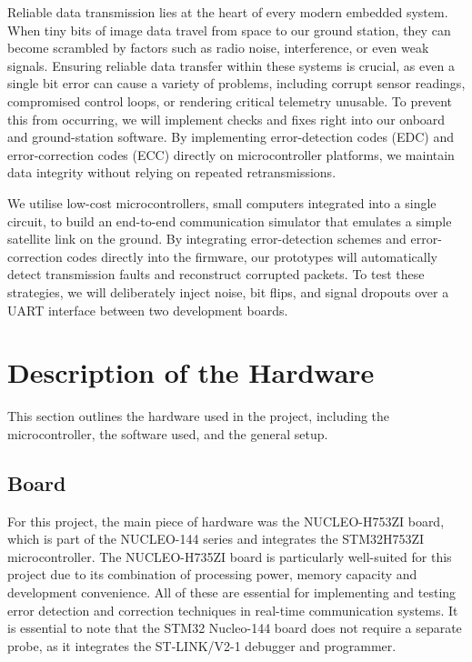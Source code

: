 \documentclass{scrartcl}
\begin{document}
Reliable data transmission lies at the heart of every modern embedded system. When tiny bits of image data travel from space to our ground station, they can become scrambled by factors such as radio noise, interference, or even weak signals. Ensuring reliable data transfer within these systems is crucial, as even a single bit error can cause a variety of problems, including corrupt sensor readings, compromised control loops, or rendering critical telemetry unusable. To prevent this from occurring, we will implement checks and fixes right into our onboard and ground-station software. By implementing error-detection codes (EDC) and error-correction codes (ECC) directly on microcontroller platforms, we maintain data integrity without relying on repeated retransmissions.

We utilise low-cost microcontrollers, small computers integrated into a single circuit, to build an end-to-end communication simulator that emulates a simple satellite link on the ground. By integrating error-detection schemes and error-correction codes directly into the firmware, our prototypes will automatically detect transmission faults and reconstruct corrupted packets. To test these strategies, we will deliberately inject noise, bit flips, and signal dropouts over a \gls{UART} interface between two development boards. 

\newpage

\section{Description of the Hardware}

This section outlines the hardware used in the project, including the microcontroller, the software used, and the general setup.

\subsection{Board}

For this project, the main piece of hardware was the NUCLEO-H753ZI board, which is part of the NUCLEO-144 series and integrates the STM32H753ZI microcontroller. The NUCLEO-H735ZI board is particularly well-suited for this project due to its combination of processing power, memory capacity and development convenience. All of these are essential for implementing and testing error detection and correction techniques in real-time communication systems. It is essential to note that the STM32 Nucleo-144 board does not require a separate probe, as it integrates the ST-LINK/V2-1 debugger and programmer. 
\end{document}
